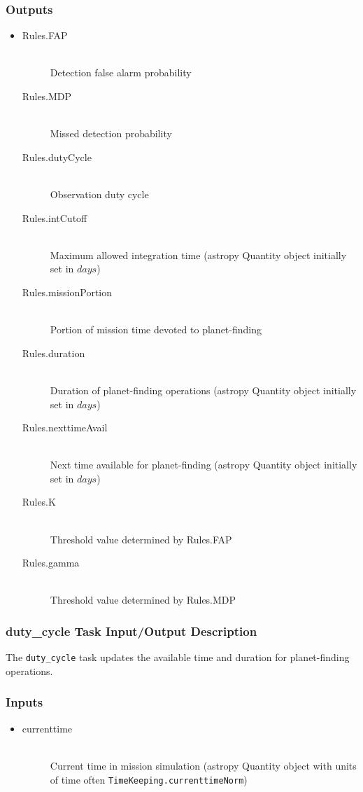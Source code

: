 \documentclass[cleanfoot]{asme2ej}
\begin{document}
\subsubsection*{Outputs}
\begin{itemize}
    \item
    \begin{description}
        \item[Rules.FAP] \hfill \\
        Detection false alarm probability
        \item[Rules.MDP] \hfill \\
        Missed detection probability
        \item[Rules.dutyCycle] \hfill \\
        Observation duty cycle
        \item[Rules.intCutoff] \hfill \\
        Maximum allowed integration time (astropy Quantity object initially set in $ days $)
        \item[Rules.missionPortion] \hfill \\
        Portion of mission time devoted to planet-finding
        \item[Rules.duration] \hfill \\
        Duration of planet-finding operations (astropy Quantity object initially set in $ days $)
        \item[Rules.nexttimeAvail] \hfill \\
        Next time available for planet-finding (astropy Quantity object initially set in $ days $)
        \item[Rules.K] \hfill \\
        Threshold value determined by Rules.FAP
        \item[Rules.gamma] \hfill \\
        Threshold value determined by Rules.MDP
    \end{description}
\end{itemize}

\subsubsection{duty\_cycle Task Input/Output Description} \label{sec:dutycycletask}
The \verb+duty_cycle+ task updates the available time and duration for planet-finding operations.

\subsubsection*{Inputs}
\begin{itemize}
    \item 
    \begin{description}
        \item[currenttime] \hfill \\
        Current time in mission simulation (astropy Quantity object with units of time often \verb+TimeKeeping.currenttimeNorm+)
    \end{description}
\end{itemize}
\end{document}
